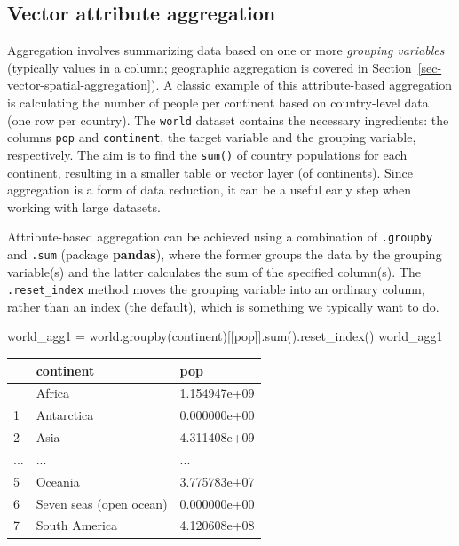 \documentclass[
  letterpaper,
]{krantz}
\newenvironment{Shaded}{\begin{snugshade}}{\end{snugshade}}
\newcommand{\BuiltInTok}[1]{\textcolor[rgb]{0.00,0.23,0.31}{#1}}
\newcommand{\NormalTok}[1]{\textcolor[rgb]{0.00,0.23,0.31}{#1}}
\newcommand{\OperatorTok}[1]{\textcolor[rgb]{0.37,0.37,0.37}{#1}}
\newcommand{\StringTok}[1]{\textcolor[rgb]{0.13,0.47,0.30}{#1}}
\begin{document}
\subsection{Vector attribute
aggregation}\label{sec-vector-attribute-aggregation}

Aggregation involves summarizing data based on one or more
\emph{grouping variables} (typically values in a column; geographic
aggregation is covered in Section~\ref{sec-vector-spatial-aggregation}).
A classic example of this attribute-based aggregation is calculating the
number of people per continent based on country-level data (one row per
country). The \texttt{world} dataset contains the necessary ingredients:
the columns \texttt{pop} and \texttt{continent}, the target variable and
the grouping variable, respectively. The aim is to find the
\texttt{sum()} of country populations for each continent, resulting in a
smaller table or vector layer (of continents). Since aggregation is a
form of data reduction, it can be a useful early step when working with
large datasets.

Attribute-based aggregation can be achieved using a combination of
\texttt{.groupby} and \texttt{.sum} (package \textbf{pandas}), where the
former groups the data by the grouping variable(s) and the latter
calculates the sum of the specified column(s). The
\texttt{.reset\_index} method moves the grouping variable into an
ordinary column, rather than an index (the default), which is something
we typically want to do.

\begin{Shaded}
\begin{Highlighting}[]
\NormalTok{world\_agg1 }\OperatorTok{=}\NormalTok{ world.groupby(}\StringTok{\textquotesingle{}continent\textquotesingle{}}\NormalTok{)[[}\StringTok{\textquotesingle{}pop\textquotesingle{}}\NormalTok{]].}\BuiltInTok{sum}\NormalTok{().reset\_index()}
\NormalTok{world\_agg1}
\end{Highlighting}
\end{Shaded}

\begin{longtable}[]{@{}lll@{}}
\toprule\noalign{}
& continent & pop \\
\midrule\noalign{}
\endhead
\bottomrule\noalign{}
\endlastfoot
0 & Africa & 1.154947e+09 \\
1 & Antarctica & 0.000000e+00 \\
2 & Asia & 4.311408e+09 \\
... & ... & ... \\
5 & Oceania & 3.775783e+07 \\
6 & Seven seas (open ocean) & 0.000000e+00 \\
7 & South America & 4.120608e+08 \\
\end{longtable}
\end{document}
